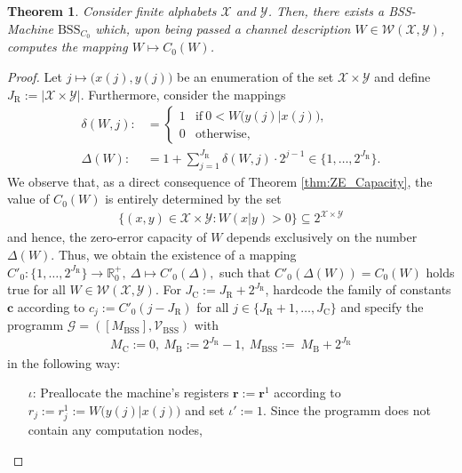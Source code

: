 \documentclass[conference]{IEEEtran}
\def\X{{\mathcal X}}
\def\Y{{\mathcal Y}}
\def\G{{\mathcal G}}
\def\V{{\mathcal V}}
\def\W{{\mathcal W}}
\def\RR{{\mathbb R}}
\newcommand{\BSS}{\mathrm{BSS}}
\newtheorem{Theorem}{Theorem}
\begin{document}
	\begin{Theorem}	\label{thm:ZeroErrorBSScomputable}
					Consider finite alphabets \(\X\) and \(\Y\). Then, there exists a BSS-Machine \(\BSS_{C_0}\)
					which, upon being passed a channel description \(W\in \W(\X,\Y)\), computes the mapping \(W \mapsto C_0(W)\).
	\end{Theorem}\begin{proof}
					Let \(j \mapsto \big(x(j), y(j)\big)\) be an enumeration of the set \(\X\times\Y\) and define
					\(J_\mathrm{R} := |\X\times \Y|\). Furthermore, consider the mappings
					\begin{align*}	\delta(W,j) :&=     \begin{cases}   1   &\text{if}~ 0 < W\big(y(j)|x(j)\big), \\
																		0   &\text{otherwise},
														\end{cases}\\
									\Delta(W)   :&=     1 + {\sum}_{j=1}^{J_\mathrm{R}} \delta(W,j)\cdot 2^{j-1} \in \big\{1,\ldots,2^{J_\mathrm{R}}\big\}.
					\end{align*} 
					We observe that, as a direct consequence of Theorem \ref{thm:ZE_Capacity}, the value of \(C_0(W)\) is 
					entirely determined by the set 
					\begin{align*}   \{(x,y) \in \X\times \Y : W(x|y) > 0\} \subseteq 2^{\X\times\Y}
					\end{align*} 
					and hence, the zero-error capacity of \(W\) depends exclusively on the number \(\Delta(W)\). Thus, we obtain the existence of a mapping
					\(C'_0 : \big\{1,\ldots,2^{J_\mathrm{R}}\big\} \rightarrow \RR_0^+,~ \Delta \mapsto C'_0(\Delta),        
					\)
					such that \(C'_0(\Delta(W)) = C_0(W)\) holds true for all \(W\in\W(\X,\Y)\). For \(J_\mathrm{C} := J_\mathrm{R} + 2^{J_\mathrm{R}}\), 
					hardcode the family of constants \(\bm{c}\) according to 
					\(  c_j := C'_0(j - J_\mathrm{R})
					\)
					for all \(j\in \{J_\mathrm{R} + 1, \ldots, J_\mathrm{C}\}\) and specify the programm \(\G = ([M_\BSS],\V_\BSS)\) with
					\begin{align*}	M_\mathrm{C} := 0,~M_\mathrm{B} := 2^{J_\mathrm{R}} - 1,~ M_\BSS := ~M_\mathrm{B} + 2^{J_\mathrm{R}}
					\end{align*}
					in the following way:
					\begin{enumerate}	\item[\(\iota\)\hspace{1pt}:] Preallocate the machine's registers \(\bm{r} := \bm{r}^1\) according to
											\(r_j := r^1_j := W\big(y(j)|x(j)\big)\) and set \(\iota' := 1\). Since the programm does not contain any computation nodes,

\end{enumerate}
\end{proof}
\end{document}

